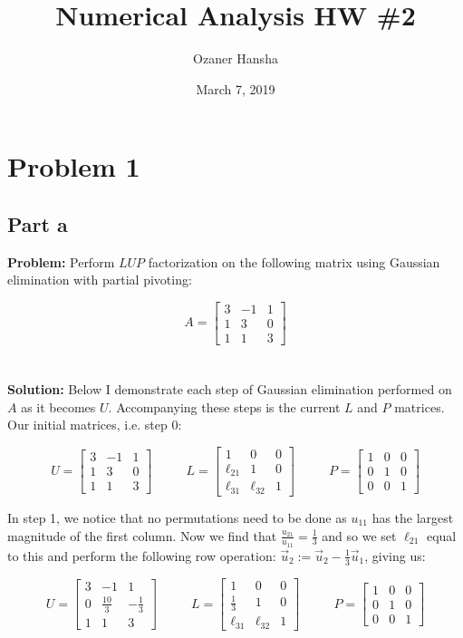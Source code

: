 \documentclass{article}
\begin{document}
\title{Numerical Analysis HW \#2}
\author{Ozaner Hansha}
\date{March 7, 2019}
\maketitle

\section*{Problem 1}
\subsection*{Part a}
\textbf{Problem:} Perform $LUP$ factorization on the following matrix using Gaussian elimination with partial pivoting:

$$A=\begin{bmatrix}
3&-1&1\\1&3&0\\1&1&3
\end{bmatrix}$$
\\\\
\textbf{Solution:} Below I demonstrate each step of Gaussian elimination performed on $A$ as it becomes $U$. Accompanying these steps is the current $L$ and $P$ matrices. Our initial matrices, i.e. step 0:

$$U=\begin{bmatrix}
3&-1&1\\1&3&0\\1&1&3
\end{bmatrix}\ \ \ \ \ \ \ \ \ \ \ \
L=\begin{bmatrix}
1&0&0\\\ell_{21}&1&0\\\ell_{31}&\ell_{32}&1
\end{bmatrix}\ \ \ \ \ \ \ \ \ \ \ \
P=\begin{bmatrix}
1&0&0\\0&1&0\\0&0&1
\end{bmatrix}$$

In step 1, we notice that no permutations need to be done as $u_{11}$ has the largest magnitude of the first column. Now we find that $\frac{u_{21}}{u_{11}}=\frac{1}{3}$ and so we set $\ell_{21}$ equal to this and perform the following row operation: $\vec u_2:=\vec u_2-\frac{1}{3}\vec u_1$, giving us:

$$U=\begin{bmatrix}
3&-1&1\\0&\frac{10}{3}&-\frac{1}{3}\\1&1&3
\end{bmatrix}\ \ \ \ \ \ \ \ \ \ \ \
L=\begin{bmatrix}
1&0&0\\\frac{1}{3}&1&0\\\ell_{31}&\ell_{32}&1
\end{bmatrix}\ \ \ \ \ \ \ \ \ \ \ \
P=\begin{bmatrix}
1&0&0\\0&1&0\\0&0&1
\end{bmatrix}$$
\end{document}
